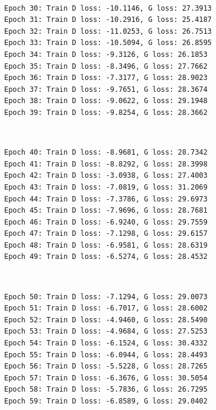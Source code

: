 \documentclass[11pt]{article}
\begin{document}
    \begin{center}
    \end{center}
    { \hspace*{\fill} \\}
    
    \begin{Verbatim}[commandchars=\\\{\}]
Epoch 30: Train D loss: -10.1146, G loss: 27.3913
Epoch 31: Train D loss: -10.2916, G loss: 25.4187
Epoch 32: Train D loss: -11.0253, G loss: 26.7513
Epoch 33: Train D loss: -10.5094, G loss: 26.8595
Epoch 34: Train D loss: -9.3126, G loss: 26.1853
Epoch 35: Train D loss: -8.3496, G loss: 27.7662
Epoch 36: Train D loss: -7.3177, G loss: 28.9023
Epoch 37: Train D loss: -9.7651, G loss: 28.3674
Epoch 38: Train D loss: -9.0622, G loss: 29.1948
Epoch 39: Train D loss: -9.8254, G loss: 28.3662

    \end{Verbatim}

    \begin{center}
    \end{center}
    { \hspace*{\fill} \\}
    
    \begin{Verbatim}[commandchars=\\\{\}]
Epoch 40: Train D loss: -8.9681, G loss: 28.7342
Epoch 41: Train D loss: -8.8292, G loss: 28.3998
Epoch 42: Train D loss: -3.0938, G loss: 27.4003
Epoch 43: Train D loss: -7.0819, G loss: 31.2069
Epoch 44: Train D loss: -7.3786, G loss: 29.6973
Epoch 45: Train D loss: -7.9696, G loss: 28.7681
Epoch 46: Train D loss: -6.9240, G loss: 29.7559
Epoch 47: Train D loss: -7.1298, G loss: 29.6157
Epoch 48: Train D loss: -6.9581, G loss: 28.6319
Epoch 49: Train D loss: -6.5274, G loss: 28.4532

    \end{Verbatim}

    \begin{center}
    \end{center}
    { \hspace*{\fill} \\}
    
    \begin{Verbatim}[commandchars=\\\{\}]
Epoch 50: Train D loss: -7.1294, G loss: 29.0073
Epoch 51: Train D loss: -6.7017, G loss: 28.6002
Epoch 52: Train D loss: -4.9460, G loss: 28.5490
Epoch 53: Train D loss: -4.9684, G loss: 27.5253
Epoch 54: Train D loss: -6.1524, G loss: 30.4332
Epoch 55: Train D loss: -6.0944, G loss: 28.4493
Epoch 56: Train D loss: -5.5228, G loss: 28.7265
Epoch 57: Train D loss: -6.3676, G loss: 30.5054
Epoch 58: Train D loss: -5.7836, G loss: 26.7295
Epoch 59: Train D loss: -6.8589, G loss: 29.0402

    \end{Verbatim}
\end{document}
